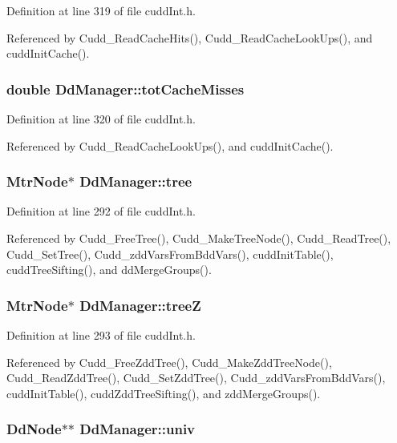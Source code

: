 Definition at line 319 of file cudd\-Int.h.

Referenced by Cudd\_\-Read\-Cache\-Hits(), Cudd\_\-Read\-Cache\-Look\-Ups(), and cudd\-Init\-Cache().
\subsubsection{\setlength{\rightskip}{0pt plus 5cm}double \bf{Dd\-Manager::tot\-Cache\-Misses}}\label{structDdManager_89f5a7f9f541f4b6ee76c68739300115}




Definition at line 320 of file cudd\-Int.h.

Referenced by Cudd\_\-Read\-Cache\-Look\-Ups(), and cudd\-Init\-Cache().
\subsubsection{\setlength{\rightskip}{0pt plus 5cm}\bf{Mtr\-Node}$\ast$ \bf{Dd\-Manager::tree}}\label{structDdManager_805f4afec8a9e4c4461dfc28307ee1ee}




Definition at line 292 of file cudd\-Int.h.

Referenced by Cudd\_\-Free\-Tree(), Cudd\_\-Make\-Tree\-Node(), Cudd\_\-Read\-Tree(), Cudd\_\-Set\-Tree(), Cudd\_\-zdd\-Vars\-From\-Bdd\-Vars(), cudd\-Init\-Table(), cudd\-Tree\-Sifting(), and dd\-Merge\-Groups().
\subsubsection{\setlength{\rightskip}{0pt plus 5cm}\bf{Mtr\-Node}$\ast$ \bf{Dd\-Manager::tree\-Z}}\label{structDdManager_748a046ca1743d33b4cfaea560cc4d48}




Definition at line 293 of file cudd\-Int.h.

Referenced by Cudd\_\-Free\-Zdd\-Tree(), Cudd\_\-Make\-Zdd\-Tree\-Node(), Cudd\_\-Read\-Zdd\-Tree(), Cudd\_\-Set\-Zdd\-Tree(), Cudd\_\-zdd\-Vars\-From\-Bdd\-Vars(), cudd\-Init\-Table(), cudd\-Zdd\-Tree\-Sifting(), and zdd\-Merge\-Groups().
\subsubsection{\setlength{\rightskip}{0pt plus 5cm}\bf{Dd\-Node}$\ast$$\ast$ \bf{Dd\-Manager::univ}}\label{structDdManager_b21d56989b9a13502aeb84228de45df0}




